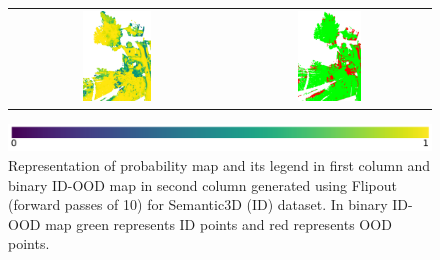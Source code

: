 \begin{figure}[h!]
\begin{tabular}{cc}
            \includegraphics[width=0.33\textwidth, height=0.18\textheight]{images/ood_imgs/fout_sem3d/fout_prob_3.pdf}& 
            \includegraphics[width=0.33\textwidth, height=0.18\textheight]{images/ood_imgs/fout_sem3d/fout_ood_auroc_3.pdf}\\
        \end{tabular}
        \includegraphics[scale=0.45]{images/prob_legend.pdf}
        \caption{Representation of probability map and its legend in first column and binary ID-OOD map in second column generated using Flipout (forward passes of 10) for Semantic3D (ID) dataset. In binary ID-OOD map green represents ID points and red represents OOD points.}
        \label{fig:fout_ood_auroc_sem3d_prob}
    \end{figure}
